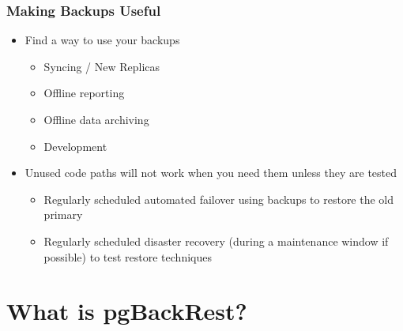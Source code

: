 \begin{frame}
    \frametitle{Making Backups Useful}

    \begin{itemize}
        \item Find a way to use your backups

        \begin{itemize}
            \item Syncing / New Replicas
            \item Offline reporting
            \item Offline data archiving
            \item Development
        \end{itemize}

        \item Unused code paths will not work when you need them unless they are tested

        \begin{itemize}
            \item Regularly scheduled automated failover using backups to restore the old primary
            \item Regularly scheduled disaster recovery (during a maintenance window if possible) to test restore techniques
        \end{itemize}
    \end{itemize}
\end{frame}

\section{What is pgBackRest?}

